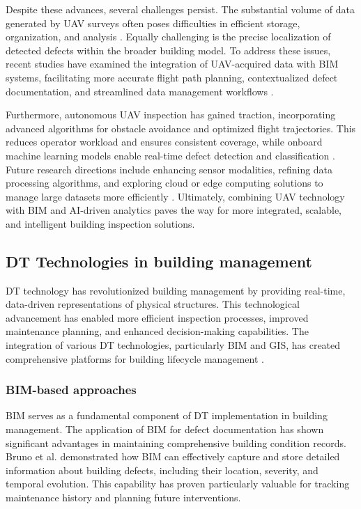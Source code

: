 \documentclass[a4paper,fleqn]{cas-sc}
\begin{document}
Despite these advances, several challenges persist. The substantial volume of data generated by UAV surveys often poses difficulties in efficient storage, organization, and analysis \cite{chen2021geo}. Equally challenging is the precise localization of detected defects within the broader building model. To address these issues, recent studies have examined the integration of UAV-acquired data with BIM systems, facilitating more accurate flight path planning, contextualized defect documentation, and streamlined data management workflows \cite{tan2021automatic, liu2021integrating}.

Furthermore, autonomous UAV inspection has gained traction, incorporating advanced algorithms for obstacle avoidance and optimized flight trajectories. This reduces operator workload and ensures consistent coverage, while onboard machine learning models enable real-time defect detection and classification \cite{ribeiro2020remote, tan2021automatic}. Future research directions include enhancing sensor modalities, refining data processing algorithms, and exploring cloud or edge computing solutions to manage large datasets more efficiently \cite{nepal2021towards}. Ultimately, combining UAV technology with BIM and AI-driven analytics paves the way for more integrated, scalable, and intelligent building inspection solutions.

\subsection{DT Technologies in building management}
DT technology has revolutionized building management by providing real-time, data-driven representations of physical structures. This technological advancement has enabled more efficient inspection processes, improved maintenance planning, and enhanced decision-making capabilities. The integration of various DT technologies, particularly BIM and GIS, has created comprehensive platforms for building lifecycle management \cite{zhang2022integrating}.

\subsubsection{BIM-based approaches}

BIM serves as a fundamental component of DT implementation in building management. The application of BIM for defect documentation has shown significant advantages in maintaining comprehensive building condition records. Bruno et al. \cite{bruno2018historic} demonstrated how BIM can effectively capture and store detailed information about building defects, including their location, severity, and temporal evolution. This capability has proven particularly valuable for tracking maintenance history and planning future interventions.
\end{document}
